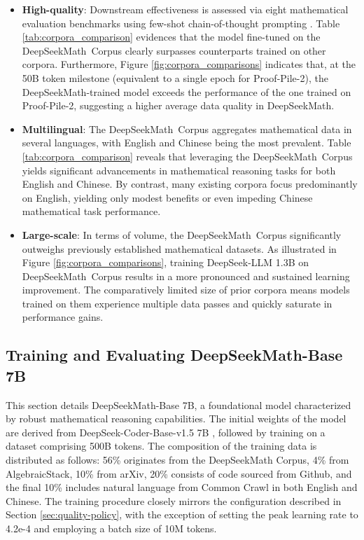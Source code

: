 \begin{itemize}[topsep=0pt]
    \item \textbf{High-quality}:
    Downstream effectiveness is assessed via eight mathematical evaluation benchmarks using few-shot chain-of-thought prompting \cite{cot}. Table \ref{tab:corpora_comparison} evidences that the model fine-tuned on the DeepSeekMath~Corpus clearly surpasses counterparts trained on other corpora. Furthermore, Figure \ref{fig:corpora_comparisons} indicates that, at the 50B token milestone (equivalent to a single epoch for Proof-Pile-2), the DeepSeekMath-trained model exceeds the performance of the one trained on Proof-Pile-2, suggesting a higher average data quality in DeepSeekMath.
    \item \textbf{Multilingual}:
    The DeepSeekMath~Corpus aggregates mathematical data in several languages, with English and Chinese being the most prevalent. Table \ref{tab:corpora_comparison} reveals that leveraging the DeepSeekMath~Corpus yields significant advancements in mathematical reasoning tasks for both English and Chinese. By contrast, many existing corpora focus predominantly on English, yielding only modest benefits or even impeding Chinese mathematical task performance.
    \item \textbf{Large-scale}:
    In terms of volume, the DeepSeekMath~Corpus significantly outweighs previously established mathematical datasets. As illustrated in Figure \ref{fig:corpora_comparisons}, training DeepSeek-LLM 1.3B on DeepSeekMath~Corpus results in a more pronounced and sustained learning improvement. The comparatively limited size of prior corpora means models trained on them experience multiple data passes and quickly saturate in performance gains.
\end{itemize}

\subsection{Training and Evaluating DeepSeekMath-Base 7B}

This section details DeepSeekMath-Base 7B, a foundational model characterized by robust mathematical reasoning capabilities. The initial weights of the model are derived from DeepSeek-Coder-Base-v1.5 7B \citep{deepseek-coder}, followed by training on a dataset comprising 500B tokens. The composition of the training data is distributed as follows: 56\% originates from the DeepSeekMath Corpus, 4\% from AlgebraicStack, 10\% from arXiv, 20\% consists of code sourced from Github, and the final 10\% includes natural language from Common Crawl in both English and Chinese. The training procedure closely mirrors the configuration described in Section \ref{sec:quality-policy}, with the exception of setting the peak learning rate to 4.2e-4 and employing a batch size of 10M tokens.

